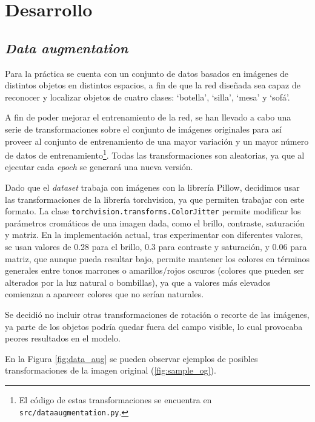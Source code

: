 \section{Desarrollo}


\subsection{\textit{Data augmentation}}
Para la práctica se cuenta con un conjunto de datos basados en imágenes de distintos objetos en distintos espacios, a fin de que la red diseñada sea capaz de reconocer y localizar objetos de cuatro clases: `botella', `silla', `mesa' y `sofá'.

A fin de poder mejorar el entrenamiento de la red, se han llevado a cabo una serie de transformaciones sobre el conjunto de imágenes originales para así proveer al conjunto de entrenamiento de una mayor variación y un mayor número de datos de entrenamiento\footnote{El código de estas transformaciones se encuentra en \texttt{src/data\textunderscore augmentation.py}.}. Todas las transformaciones son aleatorias, ya que al ejecutar cada \textit{epoch} se generará una nueva versión.

Dado que el \textit{dataset} trabaja con imágenes con la librería Pillow, decidimos usar las transformaciones de la librería torchvision, ya que permiten trabajar con este formato. La clase \texttt{torchvision.transforms.ColorJitter} permite modificar los parámetros cromáticos de una imagen dada, como el brillo, contraste, saturación y matriz. En la implementación actual, tras experimentar con diferentes valores, se usan valores de 0.28 para el brillo, 0.3 para contraste y saturación, y 0.06 para matriz, que aunque pueda resultar bajo, permite mantener los colores en términos generales entre tonos marrones o amarillos/rojos oscuros (colores que pueden ser alterados por la luz natural o bombillas), ya que a valores más elevados comienzan a aparecer colores que no serían naturales.

Se decidió no incluir otras transformaciones de rotación o recorte de las imágenes, ya parte de los objetos podría quedar fuera del campo visible, lo cual provocaba peores resultados en el modelo.

En la Figura \ref{fig:data_aug} se pueden observar ejemplos de posibles transformaciones de la imagen original (\ref{fig:sample_og}).


